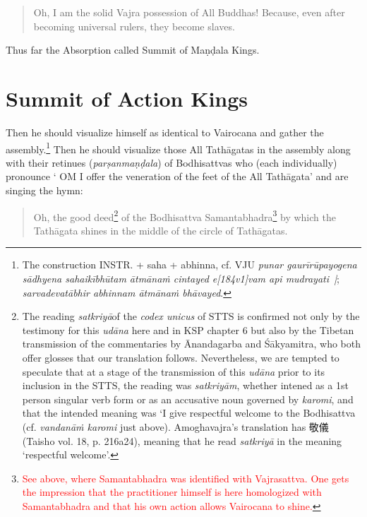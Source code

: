\documentclass[11pt]{book}
\makeatletter
\def\fakesc#1{%
  \begingroup%
  \xdef\fake@name{\csname\curr@fontshape/\f@size\endcsname}%
  \fontsize{1.3\fontdimen8\fake@name}{\baselineskip}\selectfont%
  \uppercase{#1}%
  \endgroup%
}
\newcommand{\mantra}[1]{\fakesc{#1}}
\newcommand{\red}[1]{\textcolor{red}{#1}}
\newcommand{\skt}[1]{\emph{#1}}
\makeatother
\begin{document}
\begin{verse}
Oh, I am the solid Vajra possession of All Buddhas! Because, even after becoming universal rulers, they become slaves.
\end{verse}

Thus far the Absorption called Summit of Maṇḍala Kings.

\section{Summit of Action Kings}

Then he should visualize himself as identical to Vairocana and gather the assembly.\footnote{The construction INSTR. + saha + abhinna, cf. VJU \skt{punar gaurīrūpayogena sādhyena sahaikībhūtam ātmānaṁ cintayed e[184v1]vam api mudrayati~|}; \skt{sarvadevatābhir abhinnam ātmānaṁ bhāvayed}.} Then he should visualize those All Tathāgatas in the assembly along with their retinues (\skt{parṣanmaṇḍala}) of Bodhisattvas who (each individually) pronounce `\mantra{om} I offer the veneration of the feet of the All Tathāgata' and are singing the hymn:
 
 \begin{verse}
Oh, the good deed\footnote{The reading \skt{satkriyā}of the \skt{codex unicus} of STTS is confirmed not only by the testimony for this \skt{udāna} here and in KSP chapter 6 but also by the Tibetan transmission of the commentaries by Ānandagarba and Śākyamitra, who both offer glosses that our translation follows. Nevertheless, we are tempted to speculate that at a stage of the transmission of this \skt{udāna} prior to its inclusion in the STTS, the reading was \skt{satkriyām}, whether intened as a 1st person singular verb form or as an accusative noun governed by \skt{karomi}, and that the intended meaning was `I give respectful welcome to the Bodhisattva (cf. \skt{vandanāṁ karomi} just above). Amoghavajra's translation has 敬儀 (Taisho vol. 18, p. 216a24), meaning that he read \skt{satkriyā} in the meaning `respectful welcome'.} of the Bodhisattva Samantabhadra\footnote{\red{See above, where Samantabhadra was identified with Vajrasattva. One gets the impression that the practitioner himself is here homologized with Samantabhadra and that his own action allows Vairocana to shine.}} by which the Tathāgata shines in the middle of the circle of Tathāgatas.
\end{verse}
\end{document}
